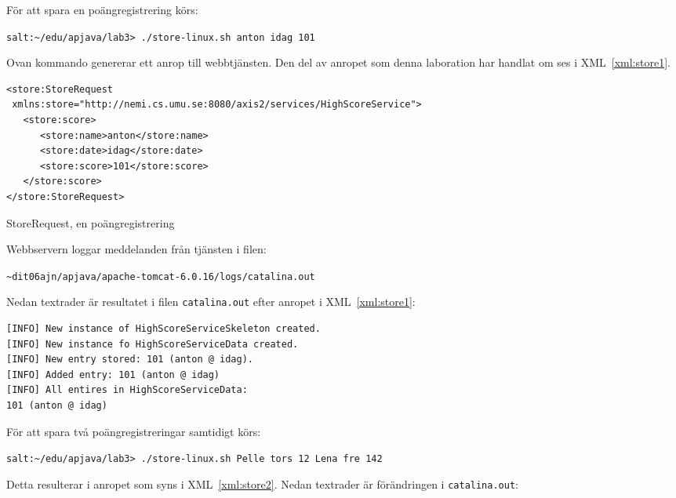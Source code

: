 \documentclass[a4paper, 12pt]{article}
\begin{document}
För att spara en poängregistrering körs:

\begin{footnotesize}
\verb!salt:~/edu/apjava/lab3> ./store-linux.sh anton idag 101!
\end{footnotesize}

Ovan kommando genererar ett anrop till webbtjänsten. Den del av
anropet som denna laboration har handlat om ses i
XML~\ref{xml:store1}.

\begin{xml}
  \begin{footnotesize}
\begin{verbatim}
<store:StoreRequest
 xmlns:store="http://nemi.cs.umu.se:8080/axis2/services/HighScoreService">
   <store:score>
      <store:name>anton</store:name>
      <store:date>idag</store:date>
      <store:score>101</store:score>
   </store:score>
</store:StoreRequest>
\end{verbatim}
  \end{footnotesize}
  \caption{StoreRequest, en poängregistrering}\label{xml:store1}
\end{xml}

Webbservern loggar meddelanden från tjänsten i filen:

\begin{footnotesize}
\verb!~dit06ajn/apjava/apache-tomcat-6.0.16/logs/catalina.out!
\end{footnotesize}

Nedan textrader är resultatet i filen \verb!catalina.out! efter
anropet i XML~\ref{xml:store1}:

\begin{footnotesize}
\begin{verbatim}
[INFO] New instance of HighScoreServiceSkeleton created.
[INFO] New instance fo HighScoreServiceData created.
[INFO] New entry stored: 101 (anton @ idag).
[INFO] Added entry: 101 (anton @ idag)
[INFO] All entires in HighScoreServiceData:
101 (anton @ idag)
\end{verbatim}
\end{footnotesize}

För att spara två poängregistreringar samtidigt körs: 

\begin{footnotesize}
\verb!salt:~/edu/apjava/lab3> ./store-linux.sh Pelle tors 12 Lena fre 142!
\end{footnotesize}

Detta resulterar i anropet som syns i XML~\ref{xml:store2}. Nedan
textrader är förändringen i \verb!catalina.out!:
\end{document}

